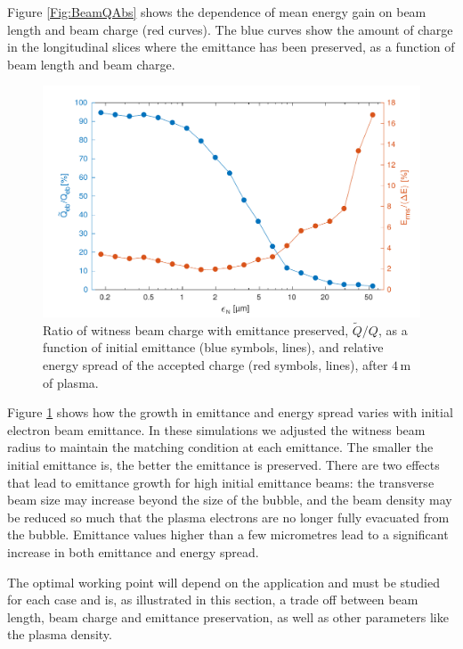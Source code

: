 \documentclass[aps,prstab,reprint,amsmath,amssymb,groupedaddress]{revtex4-1}
\newcommand{\unit}[1]{\,\mathrm{#1}}
\begin{document}
Figure \ref{Fig:BeamQAbs} shows the dependence of mean energy gain on beam length and beam charge (red curves). The blue
curves show the amount of charge in the longitudinal slices where the emittance has been preserved, as a function of
beam length and beam charge.

\begin{figure}[hbt]
    \includegraphics[width=\linewidth,trim={2mm 0mm 2mm 0mm},clip]{figures/beamQualityEmittance}
    \caption{\label{Fig:BeamQEmit} Ratio of witness beam charge with emittance preserved, $\widetilde{Q}/Q$, as a
        function of initial emittance (blue symbols, lines), and relative energy spread of the accepted charge (red
        symbols, lines), after $4\unit{m}$ of plasma.}
\end{figure}

Figure \ref{Fig:BeamQEmit} shows how the growth in emittance and energy spread varies with initial electron beam
emittance. In these simulations we adjusted the witness beam radius to maintain the matching condition at each
emittance. The smaller the initial emittance is, the better the emittance is preserved. There are two effects that lead
to emittance growth for high initial emittance beams: the transverse beam size may increase beyond the size of the
bubble, and the beam density may be reduced so much that the plasma electrons are no longer fully evacuated from the
bubble. Emittance values higher than a few micrometres lead to a significant increase in both emittance and energy
spread. 

The optimal working point will depend on the application and must be studied for each case and is, as illustrated in
this section, a trade off between beam length, beam charge and emittance preservation, as well as other parameters
like the plasma density.   
\end{document}
